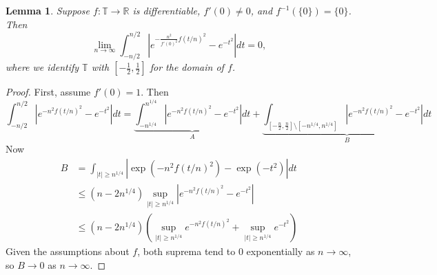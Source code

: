 \documentclass[reqno]{amsart}
\newtheorem{lemma}{Lemma}
\begin{document}
\begin{lemma}
    Suppose $f:\mathbb{T} \to \mathbb{R}$ is differentiable, $f'(0) \neq 0$, and $f^{-1}(\{0\})=\{0\}$.
    Then
    \[
    \lim_{n \to \infty}
    \int_{-n/2}^{n/2}\left|
    e^{
    -\frac{n^2}{f'(0)^2} f(t/n)^2}
    - e^{-t^2}\right|dt
    =0,
    \]
    where we identify $\mathbb{T}$ with $\left[-\frac12,\frac12\right]$ for the domain of $f$.
\end{lemma}
\begin{proof}
    First, assume $f'(0) = 1$.
    Then
    \[
        \int_{-n/2}^{n/2}\left|
        e^{
        -n^2 f(t/n)^2}
        - e^{-t^2}\right|dt
        =
        \underbrace{
        \int_{-n^{1/4}}^{n^{1/4}}\left|
        e^{-n^2 f(t/n)^2}
        - e^{-t^2}\right|dt}_A
        +\underbrace{
        \int_{\left[-\frac{n}{2}, \frac{n}{2}\right]\setminus
        \left[-n^{1/4}, n^{1/4}\right]}
        \left|
        e^{-n^2 f(t/n)^2}
        - e^{-t^2}\right|dt}_B
    \]
    Now
    \begin{align*}
        B
        &=
        \int_{|t| \geq n^{1/4}}\left|
        \exp\left(
        -n^2 f(t/n)^2 \right)
        - \exp\left(-t^2\right)\right|dt
        \\&\leq
        \left(n - 2n^{1/4}\right)\sup_{|t| \geq n^{1/4}}
        \left|e^{-n^2f(t/n)^2} - e^{-t^2}\right|
        \\&\leq
        \left(n - 2n^{1/4}\right)\left(
        \sup_{|t| \geq n^{1/4}}
        e^{-n^2f(t/n)^2}
        + \sup_{|t| \geq n^{1/4}}
        e^{-t^2}\right)
    \end{align*}
    Given the assumptions about $f$, both suprema tend to 0 exponentially as $n \to \infty$, so $B \to 0$ as $n \to \infty$.
    

\end{proof}
\end{document}
